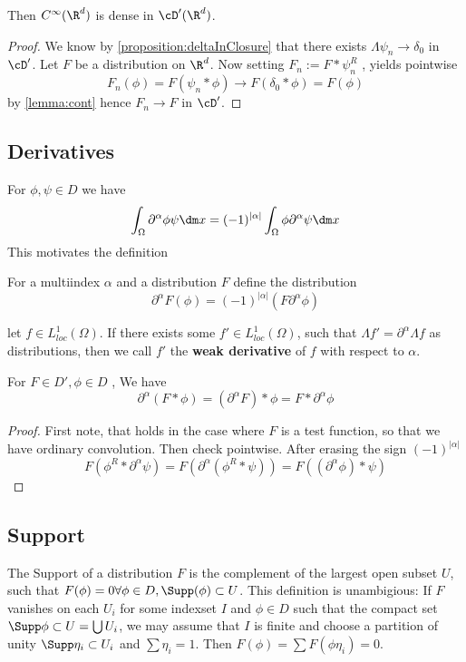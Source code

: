 	\begin{corollary}
		Then $C^\infty(\R^d)$ is dense in $\cD'(\R^d)$. 
	\end{corollary}
	\begin{proof}
		We know by \ref{proposition:deltaInClosure} that there exists $\Lambda \psi_n \to \delta_0$ in $\cD'$.
		Let $F$ be a distribution on $\R^d$. Now setting $F_n := F * \psi_n^R$ , yields pointwise 
		\[
		F_n(\phi) = F (\psi_n * \phi) \to F(\delta_0 * \phi) = F (\phi)
		\]
		by \ref{lemma:cont}
		hence $F_n \to F$ in $\cD'$.  %
		
	\end{proof}
	\subsection{Derivatives}
	For $\phi , \psi \in D$ we have
	\[
	\int_\Omega \partial^\alpha \phi \psi \dm x = (-1)^{|\alpha|} \int_\Omega \phi \partial^\alpha \psi \dm x
	\]
	This motivates the definition
	\begin{definition}
		For a multiindex $\alpha$ and a distribution $F$ define the distribution
		\[\partial^\alpha F (\phi) = (-1)^{|\alpha|}(F \partial^\alpha \phi)\]    
	\end{definition}
	\begin{rmk}
		let $f \in L^1_{loc}(\Omega)$. If there exists some $f' \in L^1_{loc}(\Omega)$, such that $\Lambda f' = \partial^\alpha \Lambda  f$ as distributions, then we call $f'$ the {\bf weak derivative} of $f$ with respect to $\alpha$.
	\end{rmk}
	\begin{proposition}
		For $F \in D', \phi \in D $ , We have 
		\[\partial^\alpha (F * \phi) = (\partial^\alpha F) * \phi = F * \partial^\alpha \phi\]
	\end{proposition}
	\begin{proof}
		First note, that holds in the case where $F$ is a test function, so that we have ordinary convolution. 
		Then check pointwise. After erasing the sign $(-1)^{|\alpha|}$
		\[
		F(\phi^R * \partial^\alpha \psi) = F(\partial^\alpha (\phi^R * \psi)) = F((\partial^\alpha \phi) * \psi)
		\]
		
	\end{proof}
	\subsection{Support}
	The Support of a distribution $F$ is the complement of the largest open subset $U$, such that $F(\phi) = 0 \forall \phi \in D, \Supp(\phi) \subset U$.  This definition is unambigious: If $F$ vanishes on each $U_i$ for some indexset $I$ and $\phi \in D$ such that the compact set $\Supp \phi \subset U = \bigcup U_i$, we may assume that $I$ is finite and choose a partition of unity $\Supp \eta_i \subset U_i$ and $\sum \eta_i = 1$. Then $F(\phi) = \sum F(\phi \eta_i) = 0$.
